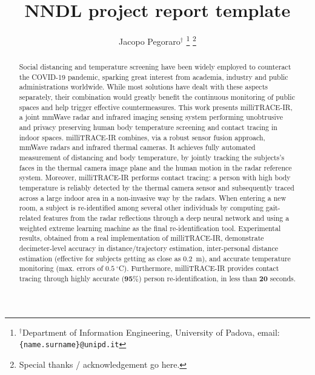 \documentclass[10pt, conference, letterpaper]{IEEEtran}
\title{NNDL project report template}
\author{Jacopo Pegoraro$^\dag$
\thanks{$^\dag$Department of Information Engineering, University of Padova, \newline email: \texttt{\{name.surname\}@unipd.it}}
\thanks{Special thanks / acknowledgement go here.}
}
\begin{document}
\maketitle

\begin{abstract}
Social distancing and temperature screening have been widely employed to counteract the COVID-19 pandemic, sparking great interest from academia, industry and public administrations worldwide. 
While most solutions have dealt with these aspects separately, their combination would greatly benefit the continuous monitoring of public spaces and help trigger effective countermeasures.
This work presents milliTRACE-IR, a joint mmWave radar and infrared imaging sensing system performing unobtrusive and privacy preserving human body temperature screening and contact tracing in indoor spaces. milliTRACE-IR combines, via a robust sensor fusion approach, mmWave radars and infrared thermal cameras. 
It achieves fully automated measurement of distancing and body temperature, by jointly tracking the subjects's faces in the thermal camera image plane and the human motion in the radar reference system. 
Moreover, milliTRACE-IR performs contact tracing: a person with high body temperature is reliably detected by the thermal camera sensor and subsequently traced across a large indoor area in a non-invasive way by the radars. When entering a new room, a subject is re-identified among several other individuals by computing gait-related features from the radar reflections through a deep neural network and using a weighted extreme learning machine as the final re-identification tool.
Experimental results, obtained from a real implementation of milliTRACE-IR, demonstrate decimeter-level accuracy in distance/trajectory estimation, inter-personal distance estimation (effective for subjects getting as close as $\boldsymbol{0.2}$~m), and accurate temperature monitoring (max. errors of $\boldsymbol{0.5}~^{\circ}$C). Furthermore, milliTRACE-IR provides contact tracing through highly accurate ($\boldsymbol{95\%}$) person re-identification, in less than $\boldsymbol{20}$ seconds.\\ 


\end{abstract}
\end{document}
